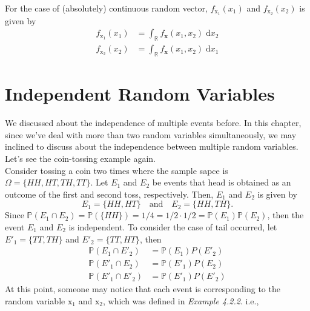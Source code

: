 \documentclass[twoside]{article}
\makeatletter
\theoremstyle{definition}
\theoremstyle{remark}
\theoremstyle{remark}
\newenvironment{example}
 {\patchcmd{\@thm}{\trivlist}{\list{}{\leftmargin=3em \rightmargin=3em}}{}{}%
  \vspace*{10\p@}
  \innerexample\pushQED{\hfill\ensuremath{\Diamond}}}
 {\popQED\endinnerexample}
\makeatother
\begin{document}
For the case of (absolutely) continuous random vector, $f_{\mathrm{x}_1}(x_1)$
and $f_{\mathrm{x}_2}(x_2)$ is given by
\begin{equation}
  \begin{split}
    f_{\mathrm{x}_1}(x_1) & = \int_{\mathbb{R}} f_{\mathbf{x}}(x_1, x_2) \;\mathrm{d}x_2\\
    f_{\mathrm{x}_2}(x_2) & = \int_{\mathbb{R}} f_{\mathbf{x}}(x_1, x_2) \;\mathrm{d}x_1
  \end{split}
\end{equation}

\section{Independent Random Variables}
We discussed about the independence of multiple events before. In this chapter,
since we've deal with more than two random variables simultaneously, we may inclined
to discuss about the independence between multiple random variables. Let's see
the coin-tossing example again.
\begin{example}{\bf Tossing a coin 2 times} \\
  Consider tossing a coin two times where the sample sapce is $\Omega = {\{ HH, HT,
  TH, TT \}}$. Let $E_1$ and $E_2$ be events that head is obtained as an outcome of
  the first and second toss, respectively. Then, $E_1$ and $E_2$ is given by
  \begin{equation*}
    E_1 = {\{ HH, HT \}} \quad \textrm{and} \quad E_2 = {\{ HH, TH \}}.
  \end{equation*}
  Since $\mathbb{P}(E_1 \cap E_2) = \mathbb{P}(\{ HH \}) = 1/4 = 1/2\cdot1/2 =
  \mathbb{P}(E_1)\mathbb{P}(E_2)$, then the event $E_1$ and $E_2$ is independent.
  To consider the case of tail occurred, let $E'_1 = \{ TT, TH \}$ and $E'_2 = \{
  TT, HT \}$, then
  \begin{equation*}
    \begin{split}
      \mathbb{P}(E_1 \cap E'_2) &= \mathbb{P}(E_1)P(E'_2) \\
      \mathbb{P}(E'_1 \cap E_2) &= \mathbb{P}(E'_1)P(E_2) \\
      \mathbb{P}(E'_1 \cap E'_2) &= \mathbb{P}(E'_1)P(E'_2)
    \end{split}
  \end{equation*}
\end{example}
At this point, someone may notice that each event is corresponding to the random
variable $\mathrm{x}_1$ and $\mathrm{x}_2$, which was defined in \textit{Example 4.2.2}. i.e.,
\end{document}
